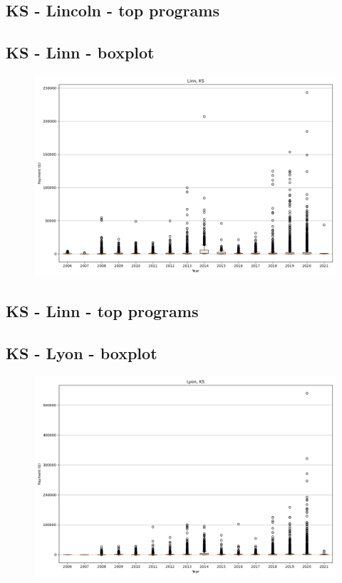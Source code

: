 \subsection*{KS - Lincoln - top programs}

\newpage
\subsection*{KS - Linn - boxplot}
\begin{figure}[h]
\centering
\includegraphics[width=7in]{../output/boxplots/counties/Linn-KS_boxplot.png}
\end{figure}


\subsection*{KS - Linn - top programs}

\newpage
\subsection*{KS - Lyon - boxplot}
\begin{figure}[h]
\centering
\includegraphics[width=7in]{../output/boxplots/counties/Lyon-KS_boxplot.png}
\end{figure}


